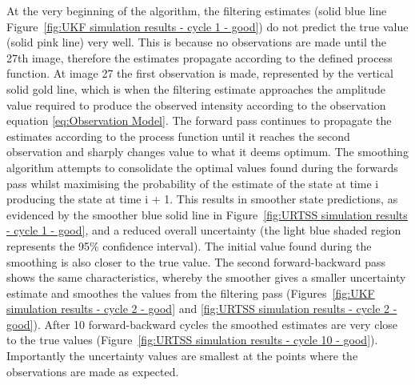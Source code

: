 At the very beginning of the algorithm, the filtering estimates (solid blue line Figure~\ref{fig:UKF simulation results - cycle 1 - good}) do not predict the true value (solid pink line) very well.
This is because no observations are made until the 27th image, therefore the estimates propagate according to the defined process function.
At image 27 the first observation is made, represented by the vertical solid gold line, which is when the filtering estimate approaches the amplitude value required to produce the observed intensity according to the observation equation \ref{eq:Observation Model}.
The forward pass continues to propagate the estimates according to the process function until it reaches the second observation and sharply changes value to what it deems optimum.
The smoothing algorithm attempts to consolidate the optimal values found during the forwards pass whilst maximising the probability of the estimate of the state at time i producing the state at time i + 1.
This results in smoother state predictions, as evidenced by the smoother blue solid line in Figure~\ref{fig:URTSS simulation results - cycle 1 - good}, and a reduced overall uncertainty (the light blue shaded region represents the 95\% confidence interval).
The initial value found during the smoothing is also closer to the true value.
The second forward-backward pass shows the same characteristics, whereby the smoother gives a smaller uncertainty estimate and smoothes the values from the filtering pass (Figures~\ref{fig:UKF simulation results - cycle 2 - good} and \ref{fig:URTSS simulation results - cycle 2 - good}).
After 10 forward-backward cycles the smoothed estimates are very close to the true values (Figure~\ref{fig:URTSS simulation results - cycle 10 - good}).
Importantly the uncertainty values are smallest at the points where the observations are made as expected.

